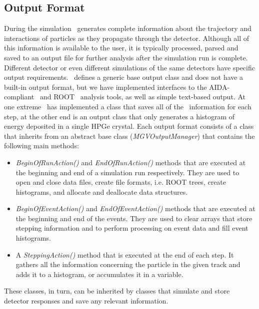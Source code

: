 \documentclass[article]{IEEEtran}
\begin{document}
\subsection{Output Format}
\label{se:output_format}
During the simulation \GF\ generates complete information about the trajectory and interactions of particles as they propagate through the detector. Although all of this information is available to the user, it is typically processed, parsed and saved to an output file for further analysis after the simulation run is complete. Different detector or even different simulations of the same detectors have specific output requirements. \MaGe\ defines a generic base output class and 
does not have a built-in output format, but we have implemented interfaces to the AIDA-compliant~\cite{aida} 
and ROOT~\cite{root} analysis tools, as well as simple text-based output.  
At one extreme \MaGe\ has implemented a class that saves all of the \GF\ information for each step, at the other end is an output class that only generates a histogram of energy deposited in a single HPGe crystal. Each output format consists of a class that inherits from an abstract base class (\emph{MGVOutputManager}) that contains the following main methods:
\begin{itemize}
\item \emph{BeginOfRunAction()} and \emph{EndOfRunAction()} methods that are executed at the beginning and end of a simulation run respectively. They are used to open and close data files, create file formats, 
i.e. ROOT trees, create histograms, and allocate and deallocate data structures.
\item \emph{BeginOfEventAction()} and \emph{EndOfEventAction()} methods that are executed at the beginning and end of the events. They are used to clear arrays that store stepping information and to perform processing on event data and fill event histograms. 
\item A \emph{SteppingAction()} method that is executed at the end of each step. It gathers all the information concerning the particle in the given track and adds it to a histogram, or accumulates it in a variable. 
\end{itemize}
These classes, in turn, can be
inherited by classes that simulate and store detector responses and
save any relevant information. 
\end{document}
